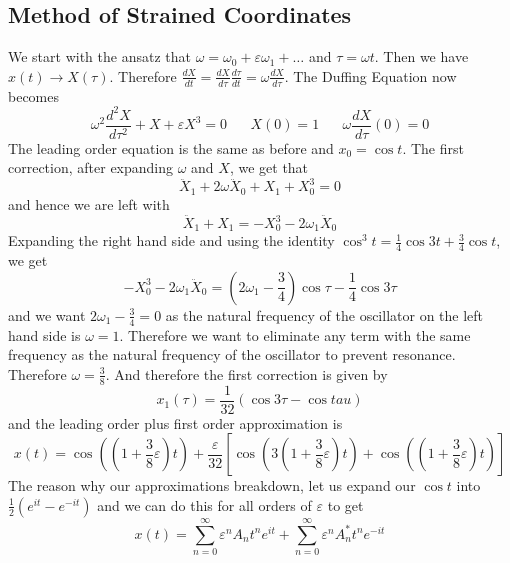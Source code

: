 \documentclass{article}
\newcommand{\od}[2]{\frac{d #1}{d #2}}
\newcommand{\odt}[2]{\frac{d^2 #1}{d #2 ^2}}
\newcommand{\twen}{\hspace{20pt}}
\begin{document}
\subsection{Method of Strained Coordinates}
We start with the ansatz that $\omega = \omega_0 + \varepsilon \omega_1 +\ldots$ and $\tau =\omega t$. Then we have $x(t) \to X(\tau)$. Therefore $\od{X}{t} = \od{X}{\tau}\od{\tau}{t} = \omega \od{X}{\tau}$. The Duffing Equation now becomes 
\begin{equation*}
    \omega^2 \odt{X}{\tau} + X +\varepsilon X^3 =0 \twen X(0)=1 \twen \omega \od{X}{\tau} (0)=0
\end{equation*}
The leading order equation is the same as before and $x_0=\cos t$. The first correction, after expanding $\omega$ and $X$, we get that 
\begin{equation*}
    \ddot X_1 + 2\omega \ddot X_0 + X_1 +X_0^3 =0
\end{equation*}
and hence we are left with 
\begin{equation*}
    \ddot X_1 + X_1 = -X_0^3-2\omega_1 \ddot X_0 
\end{equation*}
Expanding the right hand side and using the identity $\cos^3 t= \frac{1}{4}\cos 3t+ \frac{3}{4}\cos t$, we get 
\begin{equation*}
    -X_0^3-2\omega_1 \ddot X_0  = \left( 2\omega_1 -\frac{3}{4}\right) \cos \tau -\frac{1}{4}\cos 3\tau
\end{equation*}
and we want $2\omega_1 -\frac{3}{4}=0$ as the natural frequency of the oscillator on the left hand side is $\omega = 1$. Therefore we want to eliminate any term with the same frequency as the natural frequency of the oscillator to prevent resonance. Therefore $\omega = \frac{3}{8}$. And therefore the first correction is given by 
\begin{equation*}
    x_1(\tau) = \frac{1}{32}(\cos 3\tau - \cos tau)
\end{equation*}
and the leading order plus first order approximation is 
\begin{equation*}
    x(t) = \cos\left( \left( 1+ \frac{3}{8}\varepsilon\right)t \right) + \frac{\varepsilon}{32} \left[ \cos
\left( 3\left( 1+ \frac{3}{8}\varepsilon\right)t \right)+\cos \left( \left( 1+ \frac{3}{8}\varepsilon\right)t \right) \right]
\end{equation*}
The reason why our approximations breakdown, let us expand our $\cos t $ into $\frac{1}{2}(e^{it}-e^{-it})$ and we can do this for all orders of $\varepsilon$ to get 
\begin{equation*}
    x(t) =\sum^\infty_{n=0} \varepsilon^nA_nt^ne^{it} + \sum^\infty_{n=0} \varepsilon^n A^*_n t^n e^{-it}
\end{equation*}
\end{document}

